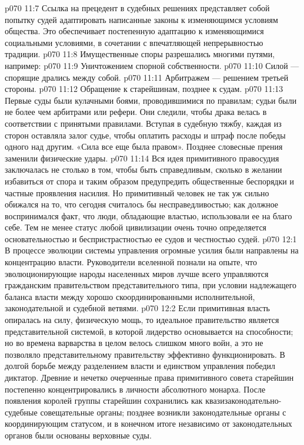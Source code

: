 \vs p070 11:7 Ссылка на прецедент в судебных решениях представляет собой попытку судей адаптировать написанные законы к изменяющимся условиям общества. Это обеспечивает постепенную адаптацию к изменяющимися социальными условиями, в сочетании с впечатляющей непрерывностью традиции.
\vs p070 11:8 \pc Имущественные споры разрешались многими путями, например:
\vs p070 11:9 \bibnobreakspace Уничтожением спорной собственности.
\vs p070 11:10 \bibnobreakspace Силой --- спорящие дрались между собой.
\vs p070 11:11 \bibnobreakspace Арбитражем --- решением третьей стороны.
\vs p070 11:12 \bibnobreakspace Обращение к старейшинам, позднее к судам.
\vs p070 11:13 \pc Первые суды были кулачными боями, проводившимися по правилам; судьи были не более чем арбитрами или рефери. Они следили, чтобы драка велась в соответствии с принятыми правилами. Вступая в судебную тяжбу, каждая из сторон оставляла залог судье, чтобы оплатить расходы и штраф после победы одного над другим. «Сила все еще была правом». Позднее словесные прения заменили физические удары.
\vs p070 11:14 Вся идея примитивного правосудия заключалась не столько в том, чтобы быть справедливым, сколько в желании избавиться от спора и таким образом предупредить общественные беспорядки и частные проявления насилия. Но примитивный человек не так уж сильно обижался на то, что сегодня считалось бы несправедливостью; как должное воспринимался факт, что люди, обладающие властью, использовали ее на благо себе. Тем не менее статус любой цивилизации очень точно определяется основательностью и беспристрастностью ее судов и честностью судей.
\vs p070 12:1 В процессе эволюции системы управления огромные усилия были направлены на концентрацию власти. Руководители вселенной познали на опыте, что эволюционирующие народы населенных миров лучше всего управляются гражданским правительством представительного типа, при условии надлежащего баланса власти между хорошо скоординированными исполнительной, законодательной и судебной ветвями.
\vs p070 12:2 \pc Если примитивная власть опиралась на силу, физическую мощь, то идеальное правительство является представительной системой, в которой лидерство основывается на способности; но во времена варварства в целом велось слишком много войн, а это не позволяло представительному правительству эффективно функционировать. В долгой борьбе между разделением власти и единством управления победил диктатор. Древние и нечетко очерченные права примитивного совета старейшин постепенно концентрировались в личности абсолютного монарха. После появления королей группы старейшин сохранились как квазизаконодательно\hyp{}судебные совещательные органы; позднее возникли законодательные органы с координирующим статусом, и в конечном итоге независимо от законодательных органов были основаны верховные суды.
